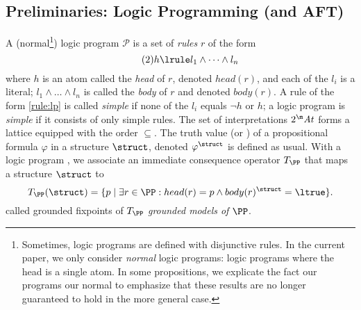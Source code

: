 


\subsection{Preliminaries: Logic Programming (and AFT)}
\renewcommand\voc\atoms
A (normal\footnote{Sometimes, logic programs are defined with disjunctive rules. In the current paper, we only consider \emph{normal} logic programs: logic programs where the head is a single atom. In some propositions, we explicate the fact our programs our normal to emphasize that these results are no longer guaranteed to hold in the more general case.}) logic program $\mathcal{P}$ is a set of \emph{rules} $r$ of the form 
\begin{equation}
 \tag{2}h\lrule l_1\land \dots \land l_n \label{rule:lp}
\end{equation}
where
$h$ is an atom called the \emph{head} of $r$, denoted $head(r)$, and each of the $l_i$ is a literal; $ l_1\land \dots \land l_n$ is called  the \emph{body} of $r$ and denoted $body(r)$.
A rule of the form \eqref{rule:lp} is called \emph{simple} if none of the $l_i$ equals $\lnot h$ or $h$; a logic program is \emph{simple} if it consists of only simple rules.
The set of interpretations $2^\voc$ forms a lattice equipped with the order $\subseteq$. 
The truth value (\ltrue or \lfalse) of a propositional formula $\varphi$ in a structure $\struct$, denoted $\varphi^\struct$ is defined as usual.
With a logic program \PP, we associate an immediate consequence operator \cite{jacm/EmdenK76} $T_\PP$ that maps a structure $\struct$ to 
	\[T_\PP(\struct) = \{p\mid \exists r \in \PP: head(r)=p\land body(r)^\struct=\ltrue\}.\] 
	 called grounded fixpoints of $T_\PP$ \emph{grounded models of $\PP$}. 
	
